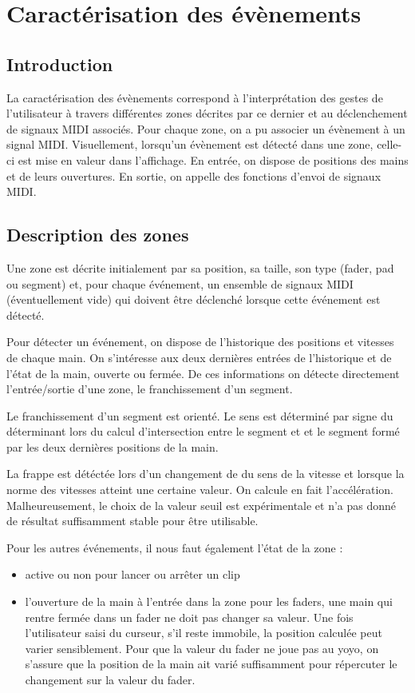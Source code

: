 \section{Caractérisation des évènements}
\subsection{Introduction}
\par La caractérisation des évènements correspond à l'interprétation des gestes de l'utilisateur à travers différentes zones décrites par ce dernier et au déclenchement de signaux MIDI associés. Pour chaque zone, on a pu associer un évènement à un signal MIDI. Visuellement, lorsqu'un évènement est détecté dans une zone, celle-ci est mise en valeur dans l'affichage. En entrée, on dispose de positions des mains et de leurs ouvertures. En sortie, on appelle des fonctions d'envoi de signaux MIDI.
\subsection{Description des zones}
\par  Une zone est décrite initialement par sa position, sa taille, son type  (fader, pad ou segment) et, pour chaque événement, un ensemble de  signaux MIDI (éventuellement vide) qui doivent être déclenché lorsque cette événement est détecté.
\par  Pour détecter un événement, on dispose de l'historique des positions et vitesses de chaque main. On s'intéresse aux deux dernières entrées de l'historique et de l'état de la main, ouverte ou fermée. De ces informations on détecte directement l'entrée/sortie d'une zone, le franchissement d'un segment. 
\par Le franchissement d'un segment est orienté. Le sens est déterminé par signe du déterminant lors du calcul d'intersection entre le segment et et le segment formé par les deux dernières positions de la main. 
\par La frappe est détéctée lors d'un changement de du sens de la vitesse et lorsque la norme des vitesses atteint une certaine valeur. On calcule en fait l'accélération. Malheureusement, le choix de la valeur seuil est expérimentale et n'a pas donné de résultat suffisamment stable pour être utilisable.
\par Pour les autres événements, il nous faut  également l'état de la zone :
\begin{itemize}
    \item active ou non pour lancer ou arrêter un clip
    \item l'ouverture de la main à l'entrée dans la zone pour les faders,  une main qui rentre fermée dans un fader ne doit pas changer sa valeur. Une fois l'utilisateur saisi du curseur, s'il reste immobile, la position calculée peut varier sensiblement. Pour que la valeur du fader ne joue pas au yoyo, on s'assure que la position de la main ait varié suffisamment pour répercuter le changement sur la valeur du fader.
\end{itemize}
